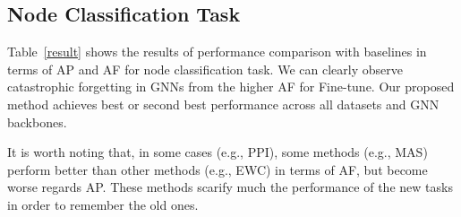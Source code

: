 \documentclass[letterpaper]{article} %
\newcommand{\xw}[1]{\textcolor{blue}{#1}}
\begin{document}
\subsection{Node Classification Task}
Table~\ref{result} shows the results of performance comparison with baselines in terms of AP and AF for node classification task.
We can clearly observe catastrophic forgetting in GNNs from the higher AF for Fine-tune. 
Our proposed method achieves best or second best performance across all datasets and GNN backbones.

It is worth noting that, in some cases (e.g., PPI), some methods (e.g., MAS) perform better than other methods (e.g., EWC) in terms of AF, but become worse regards AP.
These methods scarify much the performance 
of the new tasks in order to remember the old ones.
\end{document}
